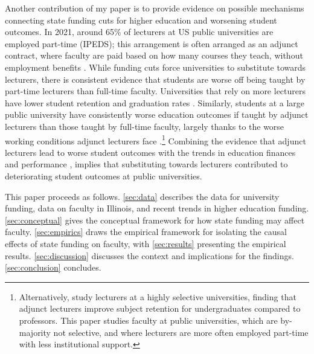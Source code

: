Another contribution of my paper is to provide evidence on possible mechanisms connecting state funding cuts for higher education and worsening student outcomes.
In 2021, around 65\% of lecturers at US public universities are employed part-time (IPEDS); this arrangement is often arranged as an adjunct contract, where faculty are paid based on how many courses they teach, without employment benefits \citep{aau2014Characteristics}.
While funding cuts force universities to substitute towards lecturers, there is consistent evidence that students are worse off being taught by part-time lecturers than full-time faculty.
Universities that rely on more lecturers have lower student retention and graduation rates \citep{jaeger2011examining,ehrenberg2005tenured}.
Similarly, students at a large public university have consistently worse education outcomes if taught by adjunct lecturers than those taught by full-time faculty, largely thanks to the worse working conditions adjunct lecturers face \citep{zhu2021limited}.\footnote{
    Alternatively, \cite{bettinger2010does,figlio2015tenure} study lecturers at a highly selective universities, finding that adjunct lecturers improve subject retention for undergraduates compared to professors.
    This paper studies faculty at public universities, which are by-majority not selective, and where lecturers are more often employed part-time with less institutional support.
}
Combining the evidence that adjunct lecturers lead to worse student outcomes with the trends in education finances and performance \citep{NBERw23736,NBERw27885}, implies that substituting towards lecturers contributed to deteriorating student outcomes at public universities.

This paper proceeds as follows.
\autoref{sec:data} describes the data for university funding, data on faculty in Illinois, and recent trends in higher education funding.
\autoref{sec:conceptual} gives the conceptual framework for how state funding may affect faculty.
\autoref{sec:empirics} draws the empirical framework for isolating the causal effects of state funding on faculty, with \autoref{sec:results} presenting the empirical results.
\autoref{sec:discussion} discusses the context and implications for the findings.
\autoref{sec:conclusion} concludes.
